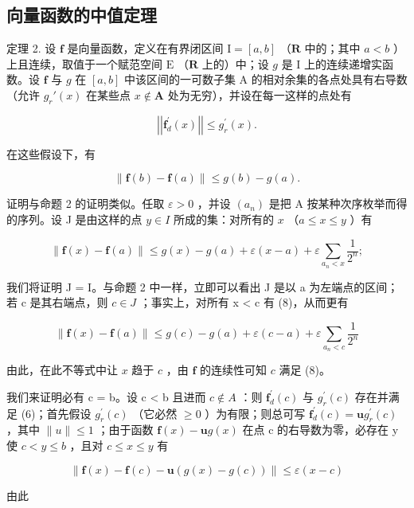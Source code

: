 \subsection{向量函数的中值定理}

定理 2. 设 \(\mathbf{f}\) 是向量函数，定义在有界闭区间 \(\mathrm{I} = [a, b]\) （\(\mathbf{R}\) 中的；其中 \(a < b\) ）上且连续，取值于一个赋范空间 \(\mathrm{E}\) （\(\mathbf{R}\) 上的）中；设 \(g\) 是 \(\mathrm{I}\) 上的连续递增实函数。设 \(\mathbf{f}\) 与 \(g\) 在 \([a, b]\) 中该区间的一可数子集 A 的相对余集的各点处具有右导数（允许 \(g_r'(x)\) 在某些点 \(x \notin \mathbf{A}\) 处为无穷），并设在每一这样的点处有

\[
\left| \left| \mathbf {f} _ {d} ^ {\prime} (x) \right| \right| \leqslant g _ {r} ^ {\prime} (x).\tag{6}
\]

在这些假设下，有

\[
\| \mathbf {f} (b) - \mathbf {f} (a) \| \leqslant g (b) - g (a).\tag{7}
\]

证明与命题 2 的证明类似。任取 \(\varepsilon > 0\) ，并设 \((a_{n})\) 是把 A 按某种次序枚举而得的序列。设 J 是由这样的点 \(y \in I\) 所成的集：对所有的 \(x\) （\(a \leqslant x \leqslant y\) ）有

\[
\| \mathbf {f} (x) - \mathbf {f} (a) \| \leqslant g (x) - g (a) + \varepsilon (x - a) + \varepsilon \sum_ {a _ {n} <   x} \frac {1}{2 ^ {n}};\tag{8}
\]

我们将证明 J = I。与命题 2 中一样，立即可以看出 J 是以 a 为左端点的区间；若 c 是其右端点，则 \(c \in J\) ；事实上，对所有 x \textless{} c 有 (8)，从而更有

\[
\| \mathbf {f} (x) - \mathbf {f} (a) \| \leqslant g (c) - g (a) + \varepsilon (c - a) + \varepsilon \sum_ {a _ {n} <   c} \frac {1}{2 ^ {n}}
\]

由此，在此不等式中让 \(x\) 趋于 \(c\) ，由 \(\mathbf{f}\) 的连续性可知 \(c\) 满足 (8)。

我们来证明必有 c = b。设 c \textless{} b 且进而 \(c \notin A\) ：则 \(\mathbf{f}_{d}^{\prime}(c)\) 与 \(g_{r}^{\prime}(c)\) 存在并满足 (6)；首先假设 \(g_{r}^{\prime}(c)\) （它必然 \(\geqslant 0\) ）为有限；则总可写 \(\mathbf{f}_{d}^{\prime}(c) = \mathbf{u}g_{r}^{\prime}(c)\) ，其中 \(\|u\| \leqslant 1\) ；由于函数 \(\mathbf{f}(x) - \mathbf{u}g(x)\) 在点 c 的右导数为零，必存在 y 使 \(c < y \leqslant b\) ，且对 \(c \leqslant x \leqslant y\) 有

\[
\| \mathbf {f} (x) - \mathbf {f} (c) - \mathbf {u} (g (x) - g (c)) \| \leqslant \varepsilon (x - c)
\]

由此

